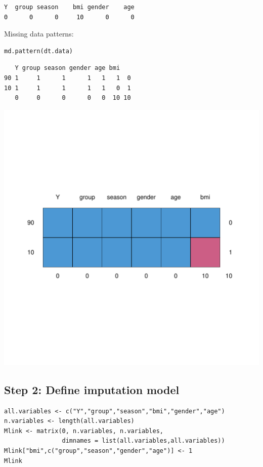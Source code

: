 \documentclass[12pt]{article}
\begin{document}
\begin{verbatim}
Y  group season    bmi gender    age 
0      0      0     10      0      0
\end{verbatim}

Missing data patterns:   
\lstset{language=r,label= ,caption= ,captionpos=b,numbers=none}
\begin{lstlisting}
md.pattern(dt.data)
\end{lstlisting}

\begin{verbatim}
   Y group season gender age bmi   
90 1     1      1      1   1   1  0
10 1     1      1      1   1   0  1
   0     0      0      0   0  10 10
\end{verbatim}

\begin{center}
\includegraphics[width=.9\linewidth]{./missingDataPattern.pdf}
\end{center}

\clearpage

\subsection{Step 2: Define imputation model}
\label{sec:orgeaf40b3}

\lstset{language=r,label= ,caption= ,captionpos=b,numbers=none}
\begin{lstlisting}
all.variables <- c("Y","group","season","bmi","gender","age")
n.variables <- length(all.variables)
Mlink <- matrix(0, n.variables, n.variables,
				dimnames = list(all.variables,all.variables))
Mlink["bmi",c("group","season","gender","age")] <- 1
Mlink
\end{lstlisting}
\end{document}
